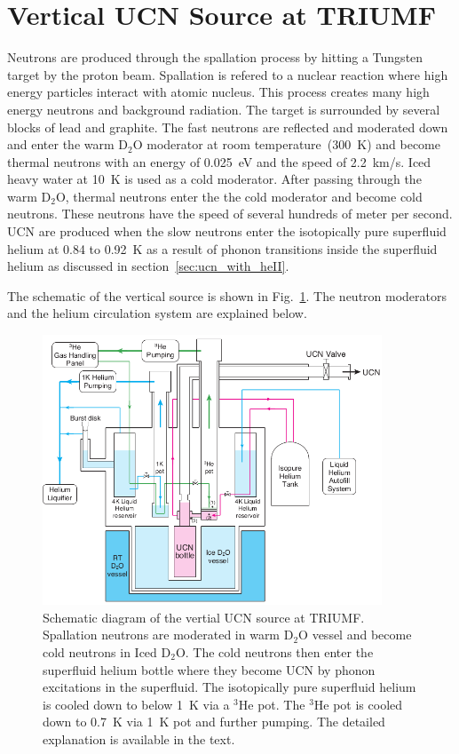 \section{Vertical UCN Source at TRIUMF\label{sec:vertical_source}}
Neutrons are produced through the spallation process by hitting a
Tungsten target by the proton beam. Spallation is refered
to a nuclear reaction where high energy particles interact with atomic
nucleus. This process creates many high energy neutrons and background
radiation. The target is surrounded by several blocks of lead and
graphite. The fast neutrons are reflected and moderated down and enter
the warm D$_2$O moderator at room temperature~(300~K) and become
thermal neutrons with an energy of 0.025~eV and the speed of 2.2~km/s.
Iced heavy water at 10~K is used as a cold moderator. After passing
through the warm D$_2$O, thermal neutrons enter the the cold moderator
and become cold neutrons. These neutrons have the speed of several
hundreds of meter per second.  UCN are produced when the slow neutrons
enter the isotopically pure superfluid helium at 0.84 to 0.92~K as a
result of phonon transitions inside the superfluid helium as discussed
in section~\ref{sec:ucn_with_heII}.

The schematic of the vertical source is shown in
Fig.~\ref{fig:source}.  The neutron moderators and the helium
circulation system are explained below.


\begin{figure}[h!]
  \centering
  \includegraphics[width=0.9\textwidth]{vertical_source.png}
  \caption{Schematic diagram of the vertial UCN source at
    TRIUMF. Spallation neutrons are moderated in warm D$_2$O vessel
    and become cold neutrons in Iced D$_2$O. The cold neutrons then
    enter the superfluid helium bottle where they become UCN by phonon
    excitations in the superfluid. The isotopically pure superfluid
    helium is cooled down to below 1~K via a $^3$He pot. The $^3$He
    pot is cooled down to 0.7~K via 1~K pot and further pumping. The
    detailed explanation is available in the text. }
  \label{fig:source}
\end{figure}


